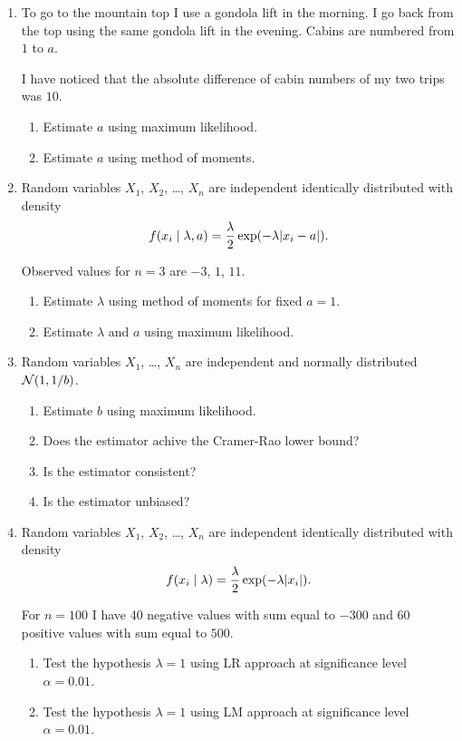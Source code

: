 \begin{enumerate}


    \item To go to the mountain top I use a gondola lift in the morning. 
    I go back from the top using the same gondola lift in the evening. 
    Cabins are numbered from $1$ to $a$. 

    I have noticed that the absolute difference of cabin numbers of my two trips was $10$. 

    \begin{enumerate}
        \item Estimate $a$ using maximum likelihood. 
        \item Estimate $a$ using method of moments. 
    \end{enumerate}

    \item Random variables $X_1$, $X_2$, \ldots,  $X_n$ are independent identically distributed with density 
    \[
    f(x_i \mid \lambda, a) = \frac{\lambda}{2} \exp(-\lambda \abs{x_i - a}).    
    \]

    Observed values for $n=3$ are $-3$, $1$, $11$.

    \begin{enumerate}
        \item Estimate $\lambda$ using method of moments for fixed $a = 1$. 
        \item Estimate $\lambda$ and $a$ using maximum likelihood.
    \end{enumerate}

    \item Random variables $X_1$, \ldots, $X_n$ are independent and normally distributed $\mathcal{N}(1, 1/b)$. 
    
    \begin{enumerate}
        \item Estimate $b$ using maximum likelihood.
        \item Does the estimator achive the Cramer-Rao lower bound?
        \item Is the estimator consistent?
        \item Is the estimator unbiased?
    \end{enumerate}

    \item Random variables $X_1$, $X_2$, \ldots,  $X_n$ are independent identically distributed with density 
    \[
    f(x_i \mid \lambda) = \frac{\lambda}{2} \exp(-\lambda \abs{x_i}).    
    \]

    For $n=100$ I have 40 negative values with sum equal to $-300$ and 60 positive values with sum equal to $500$. 

    \begin{enumerate}
        \item Test the hypothesis $\lambda = 1$ using LR approach at significance level $\alpha=0.01$.
        \item Test the hypothesis $\lambda = 1$ using LM approach at significance level $\alpha=0.01$.
    \end{enumerate}


\end{enumerate}


